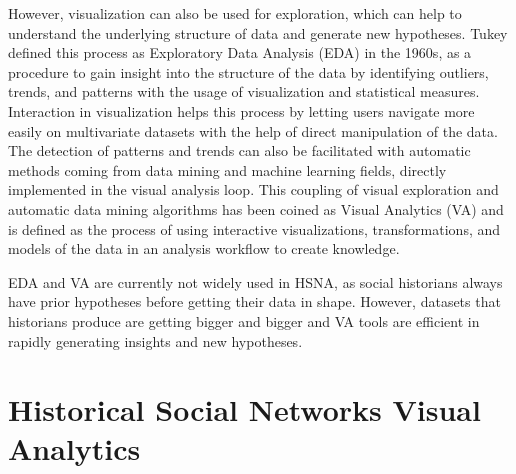 However, visualization can also be used for exploration, which can help to understand the underlying structure of data and generate new hypotheses.
Tukey defined this process as Exploratory Data Analysis (EDA) in the 1960s\cite{tukeyExploratoryDataAnalysis1977}, as a procedure to gain insight into the structure of the data by identifying outliers, trends, and patterns with the usage of visualization and statistical measures.
Interaction in visualization helps this process by letting users navigate more easily on multivariate datasets with the help of direct manipulation of the data.
The detection of patterns and trends can also be facilitated with automatic methods coming from data mining and machine learning fields, directly implemented in the visual analysis loop.
This coupling of visual exploration and automatic data mining algorithms has been coined as Visual Analytics (VA) and is defined as the process of using interactive visualizations, transformations, and models of the data in an analysis workflow to create knowledge\cite{keimVisualAnalyticsDefinition2008}.

EDA and VA are currently not widely used in HSNA, as social historians always have prior hypotheses before getting their data in shape.
However, datasets that historians produce are getting bigger and bigger and VA tools are efficient in rapidly generating insights and new hypotheses.


\section{Historical Social Networks Visual Analytics}\label{sec:intro-HSNV}


